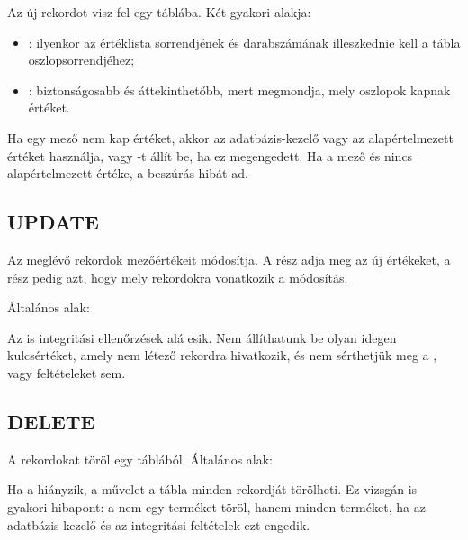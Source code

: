 Az  új rekordot visz fel egy táblába. Két gyakori alakja:

\begin{itemize}
  \item {}: ilyenkor az értéklista sorrendjének és darabszámának illeszkednie kell a tábla oszlopsorrendjéhez;
  \item {}: biztonságosabb és áttekinthetőbb, mert megmondja, mely oszlopok kapnak értéket.
\end{itemize}

Ha egy mező nem kap értéket, akkor az adatbázis-kezelő vagy az alapértelmezett értéket használja, vagy -t állít be, ha ez megengedett. Ha a mező  és nincs alapértelmezett értéke, a beszúrás hibát ad.

\subsection{UPDATE}

Az  meglévő rekordok mezőértékeit módosítja. A  rész adja meg az új értékeket, a  rész pedig azt, hogy mely rekordokra vonatkozik a módosítás.

Általános alak:

\begin{center}
\end{center}

Az  is integritási ellenőrzések alá esik. Nem állíthatunk be olyan idegen kulcsértéket, amely nem létező rekordra hivatkozik, és nem sérthetjük meg a ,  vagy  feltételeket sem.

\subsection{DELETE}

A  rekordokat töröl egy táblából. Általános alak:

\begin{center}
\end{center}

Ha a  hiányzik, a művelet a tábla minden rekordját törölheti. Ez vizsgán is gyakori hibapont: a  nem egy terméket töröl, hanem minden terméket, ha az adatbázis-kezelő és az integritási feltételek ezt engedik.


